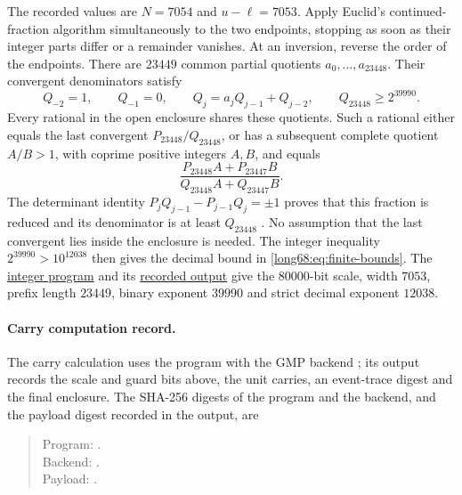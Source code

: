 The recorded values are $N=7054$ and $u-\ell=7053$.
Apply Euclid's continued-fraction algorithm simultaneously to the two
endpoints, stopping as soon as their integer parts differ or a remainder
vanishes. At an inversion, reverse the order of the endpoints. There
are $23449$ common partial quotients $a_0,\ldots,a_{23448}$.
Their convergent denominators satisfy
\[
 Q_{-2}=1,\qquad Q_{-1}=0,\qquad
 Q_j=a_jQ_{j-1}+Q_{j-2},\qquad Q_{23448}\ge2^{39990}.
\]
Every rational in the open enclosure shares these quotients. Such a
rational either equals the last convergent $P_{23448}/Q_{23448}$,
or has a subsequent complete quotient $A/B>1$, with coprime positive
integers $A,B$, and equals
\[
 \frac{P_{23448}A+P_{23447}B}{Q_{23448}A+Q_{23447}B}.
\]
The determinant identity
$P_jQ_{j-1}-P_{j-1}Q_j=\pm1$ proves that this fraction is reduced and
its denominator is at least $Q_{23448}$
\cite[\S1.12(ii), (1.12.5)--(1.12.7), (1.12.20)--(1.12.21)]{nist-dlmf}.
No assumption that the last convergent lies inside the enclosure is
needed. The integer inequality $2^{39990}>10^{12038}$ then gives the
decimal bound in \eqref{long68:eq:finite-bounds}.
The
\href{https://github.com/wcook04/plectis-erdos/blob/cd3bd6fe245867a435e15d503ccedd699c5d02e2/scripts/check_erdos68_continued_fraction.py}{integer program}
and its
\href{https://github.com/wcook04/plectis-erdos/blob/cd3bd6fe245867a435e15d503ccedd699c5d02e2/verification/erdos68-continued-fraction.json}{recorded output}
give the $80000$-bit scale, width $7053$, prefix length $23449$,
binary exponent $39990$ and strict decimal exponent $12038$.

\paragraph{Carry computation record.}
The carry calculation uses the program 
with the GMP backend ; its
output  records the scale and
guard bits above, the unit carries, an event-trace digest and the final
enclosure. The SHA-256 digests of the program and the backend, and the
payload digest recorded in the output, are
\begin{quote}\footnotesize
Program: .\\
Backend: .\\
Payload: .
\end{quote}


